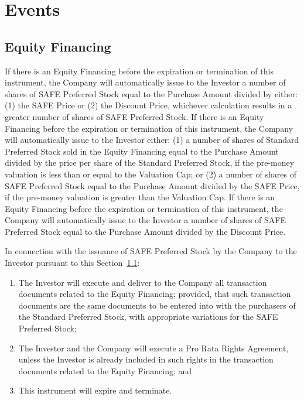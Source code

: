 \newcommand{\FinancingTerms}{
\ifcap
\ifdiscount
If there is an Equity Financing before the expiration or termination
of this instrument, the Company will automatically issue to the
Investor a number of shares of SAFE Preferred Stock equal to the
Purchase Amount divided by either: (1) the SAFE Price or (2) the
Discount Price, whichever calculation results in a greater number of
shares of SAFE Preferred Stock.
\else
If there is an Equity Financing before the expiration or termination
of this instrument, the Company will automatically issue to the
Investor either: (1) a number of shares of Standard Preferred Stock
sold in the Equity Financing equal to the Purchase Amount divided by
the price per share of the Standard Preferred Stock, if the pre-money
valuation is less than or equal to the Valuation Cap; or (2) a number
of shares of SAFE Preferred Stock equal to the Purchase Amount divided
by the SAFE Price, if the pre-money valuation is greater than the
Valuation Cap.
\fi
\else
\ifdiscount
If there is an Equity Financing before the expiration or termination
of this instrument, the Company will automatically issue to the
Investor a number of shares of SAFE Preferred Stock equal to the
Purchase Amount divided by the Discount Price.
\fi
\fi}

\section{Events}
\label{sec:events}

\subsection{Equity Financing}
\label{sec:equityfinancing}

\FinancingTerms{}

In connection with the issuance of SAFE Preferred Stock by the Company
to the Investor pursuant to this Section~\ref{sec:equityfinancing}:

\begin{enumerate}[label=(\alph*)]

\item {
\begin{sloppypar}
    The Investor will execute and deliver to the Company all
    transaction documents related to the Equity Financing; provided,
    that such transaction documents are the same documents to be
    entered into with the purchasers of the Standard Preferred Stock,
    with appropriate variations for the SAFE Preferred Stock;
\end{sloppypar}}

\item {The Investor and the Company will execute a Pro Rata Rights
    Agreement, unless the Investor is already included in such rights
    in the transaction documents related to the Equity Financing; and}

\item {This instrument will expire and terminate.}

\end{enumerate}

